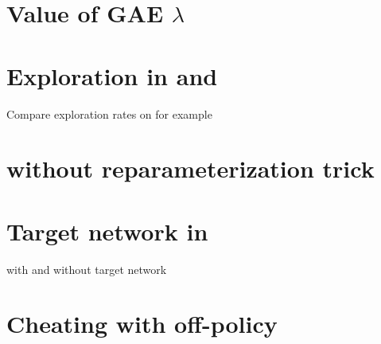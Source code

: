 \section{Value of GAE $\lambda$}

\section{Exploration in \tdt and \sac}

Compare exploration rates on  for example

\section{\sac without reparameterization trick}

\section{Target network in \dqn}

\dqn with and without target network

\section{Cheating with off-policy \ppo}